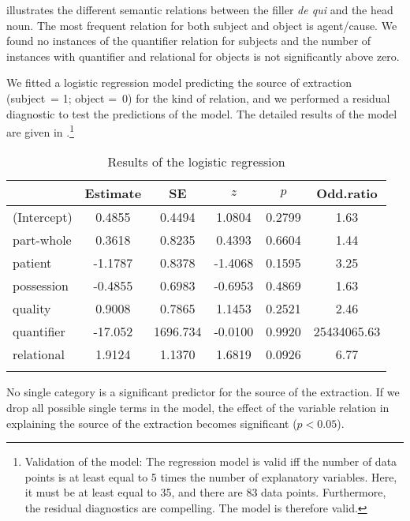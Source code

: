  illustrates the different semantic relations between the filler \emph{de qui} and the head noun. The most frequent relation for both subject and object is agent/cause. We found no instances of the quantifier relation for subjects and the number of instances with quantifier and relational for objects is not significantly above zero.

We fitted a logistic regression model predicting the source of extraction (subject~= 1; object =~0) for the kind of relation, and we performed a residual diagnostic to test the predictions of the model. The detailed results of the model are given in .\footnote{Validation of the model: The regression model is valid iff the number of data points is at least equal to 5 times the number of explanatory variables. Here, it must be at least equal to 35, and there are 83 data points. Furthermore, the residual diagnostics are compelling. The model is therefore valid.} 

\begin{table}
\begin{tabular}{l S[table-format=-2.3] S[table-format=4.3] S[table-format=-1.4] S[table-format=1.4] S[table-format=8.2]}
  \lsptoprule
         & {Estimate} & {SE} & {$z$} & {$p$} & {Odd.ratio} \\ 
  \midrule
(Intercept)   & 0.4855 & 0.4494 & 1.0804 & 0.2799 & 1.63 \\ 
   part-whole & 0.3618 & 0.8235 & 0.4393 & 0.6604 & 1.44 \\ 
   patient    & -1.1787 & 0.8378 & -1.4068 & 0.1595 & 3.25 \\ 
   possession & -0.4855 & 0.6983 & -0.6953 & 0.4869 & 1.63 \\ 
   quality    & 0.9008  & 0.7865 & 1.1453 & 0.2521 & 2.46 \\ 
   quantifier & -17.052 & 1696.734 & -0.0100 & 0.9920 & 25434065.63 \\ 
   relational & 1.9124  & 1.1370 & 1.6819 & 0.0926 & 6.77 \\ 
   \lspbottomrule
\end{tabular}
\caption{Results of the logistic regression}
        \label{tab:dq2000-relations}
\end{table}

No single category is a significant predictor for the source of the extraction. If we drop all possible single terms in the model, the effect of the variable relation in explaining the source of the extraction becomes significant ($p<0.05$).

